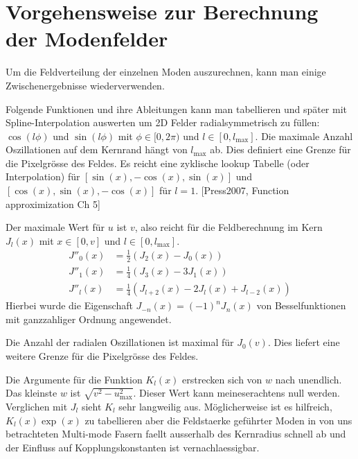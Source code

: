 \documentclass[DIV19,twocolumn]{scrartcl}
\def\({\left(}
\def\){\right)}
\newcommand{\lmax}{l_\textrm{max}}
\newcommand{\umax}{u_\textrm{max}}
\begin{document}
\section{Vorgehensweise zur Berechnung der Modenfelder}
Um die Feldverteilung der einzelnen Moden auszurechnen, kann man
einige Zwischenergebnisse wiederverwenden.

Folgende Funktionen und ihre Ableitungen kann man tabellieren und
sp\"ater mit Spline-Interpolation auswerten um 2D Felder
radialsymmetrisch zu f\"ullen: $\cos(l\phi)$ und $\sin(l\phi)$ mit
$\phi\in[0,2\pi)$ und $l\in[0,\lmax]$. Die maximale Anzahl
Oszillationen auf dem Kernrand h\"angt von $\lmax$ ab. Dies definiert
eine Grenze f\"ur die Pixelgr\"osse des Feldes. Es reicht eine
zyklische lookup Tabelle (oder Interpolation) f\"ur
$[\sin(x),-\cos(x),\sin(x)]$ und $[\cos(x),\sin(x),-\cos(x)]$ f\"ur $l=1$.
[Press2007, Function approximization Ch 5]


Der maximale Wert f\"ur $u$ ist $v$, also reicht f\"ur die
Feldberechnung im Kern $J_l(x)$ mit
$x\in[0,v]$ und $l\in[0,\lmax]$. 
\begin{align}
  J''_0(x) &= \frac{1}{2}\(J_2(x)-J_0(x)\)\\
  J''_1(x) &= \frac{1}{4}\(J_3(x)-3J_1(x)\)\\
  J''_l(x) &= \frac{1}{4}\(J_{l+2}(x)-2J_l(x)+J_{l-2}(x)\)
\end{align}
Hierbei wurde die Eigenschaft $J_{-n}(x) = (-1)^n J_n(x)$ von
Besselfunktionen mit ganzzahliger Ordnung angewendet.

Die Anzahl der radialen Oszillationen ist maximal f\"ur $J_0(v)$. Dies
liefert eine weitere Grenze f\"ur die Pixelgr\"osse des Feldes.

Die Argumente f\"ur die Funktion $K_l(x)$ erstrecken sich von $w$ nach
unendlich. Das kleinste $w$ ist $\sqrt{v^2-\umax^2}$. Dieser Wert kann
meineserachtens null werden. Verglichen mit $J_l$ sieht $K_l$ sehr
langweilig aus. M\"oglicherweise ist es hilfreich, $K_l(x)\exp(x)$ zu
tabellieren aber die Feldstaerke gef\"uhrter Moden in von uns
betrachteten Multi-mode Fasern faellt ausserhalb des Kernradius
schnell ab und der Einfluss auf Kopplungskonstanten ist
vernachlaessigbar.

\end{document}
